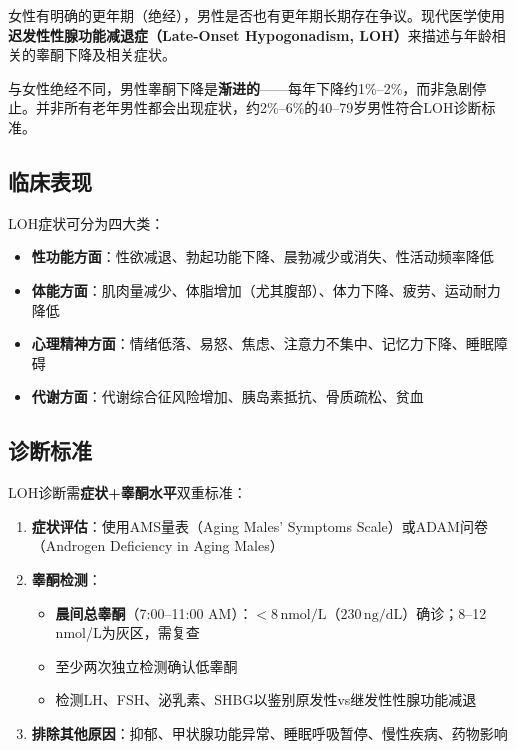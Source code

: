 女性有明确的更年期（绝经），男性是否也有更年期长期存在争议。现代医学使用\textbf{迟发性性腺功能减退症（Late-Onset Hypogonadism, LOH）}来描述与年龄相关的睾酮下降及相关症状。

与女性绝经不同，男性睾酮下降是\textbf{渐进的}——每年下降约1\%--2\%，而非急剧停止。并非所有老年男性都会出现症状，约2\%--6\%的40--79岁男性符合LOH诊断标准。

\subsection{临床表现}

LOH症状可分为四大类：

\begin{itemize}[leftmargin=2cm]
	\item \textbf{性功能方面}：性欲减退、勃起功能下降、晨勃减少或消失、性活动频率降低
	\item \textbf{体能方面}：肌肉量减少、体脂增加（尤其腹部）、体力下降、疲劳、运动耐力降低
	\item \textbf{心理精神方面}：情绪低落、易怒、焦虑、注意力不集中、记忆力下降、睡眠障碍
	\item \textbf{代谢方面}：代谢综合征风险增加、胰岛素抵抗、骨质疏松、贫血
\end{itemize}

\subsection{诊断标准}

LOH诊断需\textbf{症状+睾酮水平}双重标准：

\begin{enumerate}
	\item \textbf{症状评估}：使用AMS量表（Aging Males' Symptoms Scale）或ADAM问卷（Androgen Deficiency in Aging Males）
	\item \textbf{睾酮检测}：
		\begin{itemize}
		\item \textbf{晨间总睾酮}（7:00--11:00 AM）：$<8\,\mathrm{nmol/L}$（$230\,\mathrm{ng/dL}$）确诊；8--12 nmol/L为灰区，需复查
		\item 至少两次独立检测确认低睾酮
		\item 检测LH、FSH、泌乳素、SHBG以鉴别原发性vs继发性性腺功能减退
		\end{itemize}
	\item \textbf{排除其他原因}：抑郁、甲状腺功能异常、睡眠呼吸暂停、慢性疾病、药物影响
\end{enumerate}

